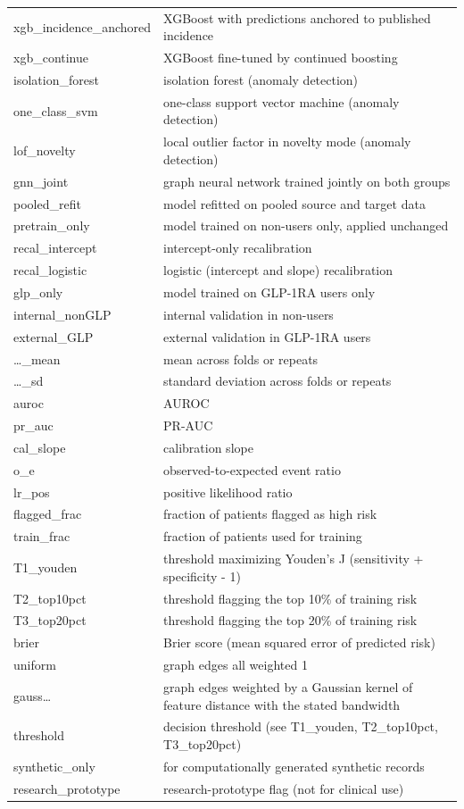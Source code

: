 \documentclass[journal]{IEEEtran}
\begin{document}
{\begin{longtable}[]{@{}
  >{\raggedright\arraybackslash}p{}
  >{\raggedright\arraybackslash}p{}@{}}
xgb\_incidence\_anchored & XGBoost with predictions anchored to
published incidence \\
xgb\_continue & XGBoost fine-tuned by continued boosting \\
isolation\_forest & isolation forest (anomaly detection) \\
one\_class\_svm & one-class support vector machine (anomaly
detection) \\
lof\_novelty & local outlier factor in novelty mode (anomaly
detection) \\
gnn\_joint & graph neural network trained jointly on both groups \\
pooled\_refit & model refitted on pooled source and target data \\
pretrain\_only & model trained on non-users only, applied unchanged \\
recal\_intercept & intercept-only recalibration \\
recal\_logistic & logistic (intercept and slope) recalibration \\
glp\_only & model trained on GLP-1RA users only \\
internal\_nonGLP & internal validation in non-users \\
external\_GLP & external validation in GLP-1RA users \\
\ldots\_mean & mean across folds or repeats \\
\ldots\_sd & standard deviation across folds or repeats \\
auroc & AUROC \\
pr\_auc & PR-AUC \\
cal\_slope & calibration slope \\
o\_e & observed-to-expected event ratio \\
lr\_pos & positive likelihood ratio \\
flagged\_frac & fraction of patients flagged as high risk \\
train\_frac & fraction of patients used for training \\
T1\_youden & threshold maximizing Youden's J (sensitivity + specificity
- 1) \\
T2\_top10pct & threshold flagging the top 10\% of training risk \\
T3\_top20pct & threshold flagging the top 20\% of training risk \\
brier & Brier score (mean squared error of predicted risk) \\
uniform & graph edges all weighted 1 \\
gauss\ldots{} & graph edges weighted by a Gaussian kernel of feature
distance with the stated bandwidth \\
threshold & decision threshold (see T1\_youden, T2\_top10pct,
T3\_top20pct) \\
synthetic\_only & 1 for computationally generated synthetic records \\
research\_prototype & research-prototype flag (not for clinical use) \\
\end{longtable}
}
\end{document}
